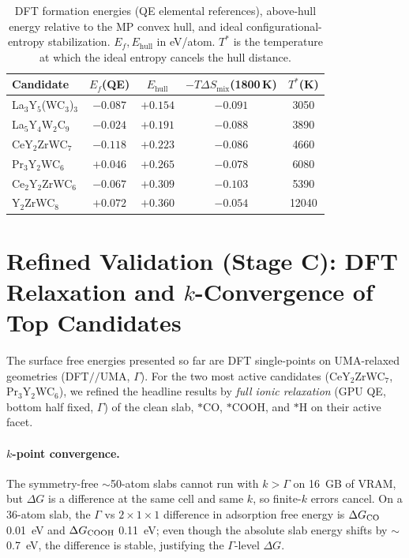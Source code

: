 \documentclass[11pt,a4paper]{report}
\begin{document}
\begin{table}[t]
\centering
\caption{DFT formation energies (QE elemental references), above-hull energy relative to the MP convex hull, and ideal configurational-entropy
stabilization. $E_f, E_{\mathrm{hull}}$ in eV/atom. $T^\ast$ is the temperature at which the ideal entropy cancels the hull distance.}
\label{tab:hull}
\small
\begin{tabular}{lcccc}
\hline
Candidate & $E_f$(QE) & $E_{\mathrm{hull}}$ & $-T\Delta S_{\mathrm{mix}}$(1800\,K) & $T^\ast$(K) \\
\hline
La$_3$Y$_5$(WC$_3$)$_3$ & $-0.087$ & $+0.154$ & $-0.091$ & 3050 \\
La$_5$Y$_4$W$_2$C$_9$   & $-0.024$ & $+0.191$ & $-0.088$ & 3890 \\
CeY$_2$ZrWC$_7$         & $-0.118$ & $+0.223$ & $-0.086$ & 4660 \\
Pr$_3$Y$_2$WC$_6$       & $+0.046$ & $+0.265$ & $-0.078$ & 6080 \\
Ce$_2$Y$_2$ZrWC$_6$     & $-0.067$ & $+0.309$ & $-0.103$ & 5390 \\
Y$_2$ZrWC$_8$           & $+0.072$ & $+0.360$ & $-0.054$ & 12040 \\
\hline
\end{tabular}
\end{table}

\section{Refined Validation (Stage C): DFT Relaxation and $k$-Convergence of Top Candidates}
\label{sec:stagec}
The surface free energies presented so far are DFT single-points on UMA-relaxed geometries (DFT$/\!/$UMA, $\Gamma$). For the two most
active candidates (CeY$_2$ZrWC$_7$, Pr$_3$Y$_2$WC$_6$), we refined the headline results by \emph{full ionic relaxation}
(GPU QE, bottom half fixed, $\Gamma$) of the clean slab, $*$CO, $*$COOH, and $*$H on their active facet.

\paragraph{$k$-point convergence.} The symmetry-free $\sim$50-atom slabs cannot run with $k>\Gamma$ on 16~GB of VRAM, but
$\Delta G$ is a difference at the same cell and same $k$, so finite-$k$ errors cancel. On a 36-atom slab, the $\Gamma$ vs
$2{\times}1{\times}1$ difference in adsorption free energy is $\Delta G_{\rm CO}$ 0.01~eV and $\Delta G_{\rm COOH}$ 0.11~eV; even though
the absolute slab energy shifts by $\sim$0.7~eV, the difference is stable, justifying the $\Gamma$-level $\Delta G$.
\end{document}
